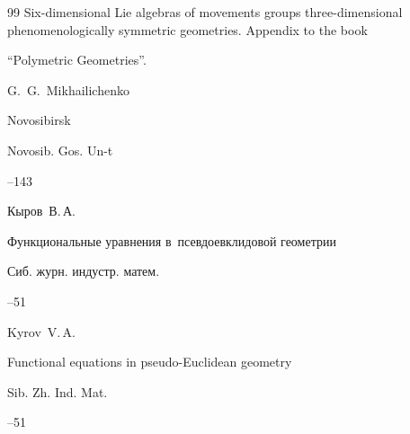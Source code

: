 \begin{thebibliography}{99}
\paperinfo Six-dimensional Lie algebras  of  movements groups three-dimensional  phe\-no\-meno\-logically symmetric geometries. Appendix to the book \nofrills

\inbook ``Polymetric Geometries''\nofrills.

\byy G.~G.~Mikhailichenko \nofrills

\publaddr Novosibirsk

\publ Novosib. Gos. Un-t


--143






\by Кыров~В.\,А.

\paper Функциональные уравнения в~псевдоевклидовой геометрии

\jour Сиб. журн. индустр. матем.




--51

\misctransl

\by Kyrov~V.\,A.

\paper Functional equations in pseudo-Euclidean geometry

\jour Sib. Zh. Ind. Mat.




--51





\end{thebibliography}



\noindent

\hskip6.5cm \thedate \par\noindent

\hskip6.5cm\therevdate







\makeengtitlem





\newpage







%

%

